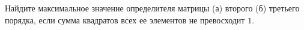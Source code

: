 \documentclass{article}
\begin{document}
Найдите максимальное значение определителя матрицы (а) второго (б) третьего порядка, если сумма квадратов всех ее элементов не превосходит $1$.
\end{document}
